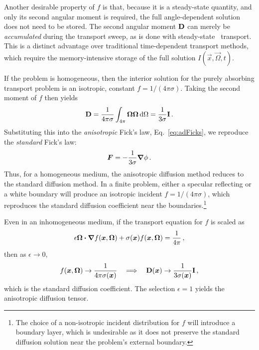 Another desirable property of $f$ is that, because it is a steady-state
quantity, and only its second angular moment is required, the
full angle-dependent solution does not need to be stored. The second angular
moment $\mathbf{D}$ can merely be \emph{accumulated} during the transport sweep, as
is done with steady-state
\SN\ transport. This is a distinct
advantage over traditional time-dependent transport methods, which require the
memory-intensive storage of the full solution $I(\vec{x},\vec{\Omega},t)$.

If the problem is homogeneous, then the interior solution for the purely
absorbing transport problem is an isotropic, constant $f=1/(4\pi\sigma)$.
Taking the second moment of $f$ then yields
\begin{equation*}
  \mathbf{D} = \frac{1}{4\pi\sigma} \int_{4\pi} \bm{\Omega} \bm{\Omega} \mathop{}\!\mathrm{d} \Omega
  = \frac{1}{3\sigma} \mathbf{I}\,.
\end{equation*}
Substituting this into the \emph{anisotropic} Fick's law,
Eq.~\eqref{eq:adFicks}, we reproduce the \emph{standard} Fick's law:
\begin{equation*}
  \bm{F} = - \frac{1}{3\sigma} \bm{\nabla} \phi\,.
\end{equation*}
Thus, for a homogeneous medium, the anisotropic diffusion method
reduces to the standard diffusion method. In a finite problem, either a specular
reflecting or a white boundary will produce an isotropic incident
$f=1/(4\pi\sigma)$, which reproduces the standard diffusion coefficient near the
boundaries.\footnote{%
The choice of a non-isotropic incident distribution for $f$ will introduce a
boundary layer, which is undesirable as it does not preserve the
standard diffusion solution near the problem's external boundary.}

Even in an inhomogeneous medium, if the transport equation for $f$ is
scaled as
\begin{equation*}
  \epsilon \bm{\Omega}\bm{\cdot}\bm{\nabla} f(\bm{x},\bm{\Omega})
  + \sigma(\bm{x})  f(\bm{x},\bm{\Omega}) = \frac{1}{4\pi}\,,
\end{equation*}
then as $\epsilon\to 0$,
\begin{equation*}
  f(\bm{x}, \bm{\Omega}) \to \frac{1}{4\pi \sigma(\bm{x})} \quad \Longrightarrow \quad
  \mathbf{D}(\bm{x}) \to \frac{1}{3 \sigma(\bm{x})} \mathbf{I}\,,
\end{equation*}
which is the standard diffusion coefficient. The selection $\epsilon=1$ yields
the
anisotropic diffusion tensor.

